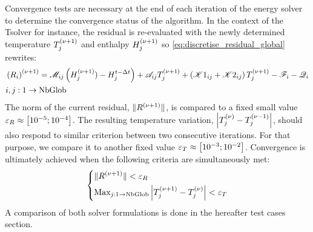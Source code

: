 Convergence tests are necessary at the end of each iteration of the energy solver to determine 
the convergence status of the algorithm. In the context of the Tsolver for instance, the residual 
is re-evaluated with the newly determined temperature $\Tj^\iterplus$ and enthalpy $\Hj^\iterplus$ so \cref{eq:discretise_residual_global} rewrites:
\begin{align}
\begin{split}
\label{eq:discretise_residual_global_new}
& \brac{R_i}^\iterplus = \Mij \brac{\Hj^\iterplus) - \Hjtminus} + \Aij \Tj^\iterplus + \brac{\Kija + \Kijb}\Tj^\iterplus -\Fi - \Qi \\
& i,j:1 \rightarrow \text{NbGlob}
\end{split}
\end{align}
The norm of the current residual, $\norm{R^\iterplus}$, is compared to a fixed small 
value $\varepsilon_R \approx \crochet{\num{d-5};\num{d-4}}$. The resulting temperature variation, 
$\abval{\Tj^\iter-\Tj^\iterminus}$, should also respond to similar criterion between two consecutive 
iterations. For that purpose, we compare it to another fixed value $\varepsilon_T \approx \crochet{\num{d-3};\num{d-2}}$.
Convergence is ultimately achieved when the following criteria are simultaneously met:
\begin{equation}
\label{eq:energy_convergence_criteria}
   \left\{
   \begin{aligned}
      & \norm{R^\iterplus} < \varepsilon_R \\
	  & \text{Max}_{j:1 \rightarrow \text{NbGlob}} \abval{\Tj^\iterplus-\Tj^\iter} < \varepsilon_T
    \end{aligned}
    \right.
\end{equation}
A comparison of both solver formulations is done in the hereafter test cases section.
%
%
%
